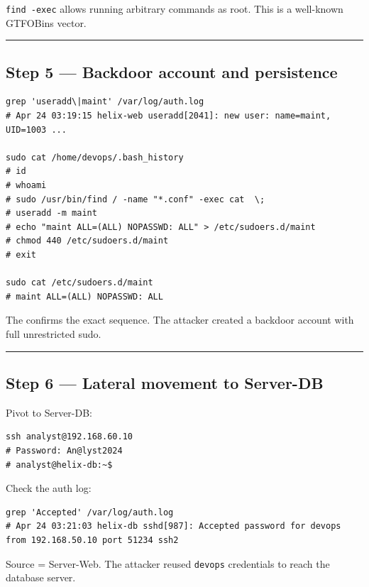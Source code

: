 \texttt{find\ -exec} allows running arbitrary commands as root. This is a well-known GTFOBins vector.

\begin{center}\rule{0.5\linewidth}{0.5pt}\end{center}

\subsection{Step 5 --- Backdoor account and persistence}

\begin{lstlisting}
grep 'useradd\|maint' /var/log/auth.log
# Apr 24 03:19:15 helix-web useradd[2041]: new user: name=maint, UID=1003 ...

sudo cat /home/devops/.bash_history
# id
# whoami
# sudo /usr/bin/find / -name "*.conf" -exec cat  \;
# useradd -m maint
# echo "maint ALL=(ALL) NOPASSWD: ALL" > /etc/sudoers.d/maint
# chmod 440 /etc/sudoers.d/maint
# exit

sudo cat /etc/sudoers.d/maint
# maint ALL=(ALL) NOPASSWD: ALL
\end{lstlisting}

The  confirms the exact sequence. The attacker created a backdoor account with full unrestricted sudo.

\begin{center}\rule{0.5\linewidth}{0.5pt}\end{center}

\subsection{Step 6 --- Lateral movement to Server-DB}

Pivot to Server-DB:

\begin{lstlisting}
ssh analyst@192.168.60.10
# Password: An@lyst2024
# analyst@helix-db:~$
\end{lstlisting}

Check the auth log:

\begin{lstlisting}
grep 'Accepted' /var/log/auth.log
# Apr 24 03:21:03 helix-db sshd[987]: Accepted password for devops from 192.168.50.10 port 51234 ssh2
\end{lstlisting}

Source  = Server-Web. The attacker reused \texttt{devops} credentials to reach the database server.

